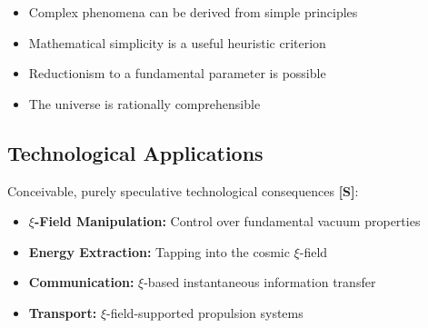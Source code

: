 	\begin{itemize}
		\item Complex phenomena can be derived from simple principles
		\item Mathematical simplicity is a useful heuristic criterion
		\item Reductionism to a fundamental parameter is possible
		\item The universe is rationally comprehensible
	\end{itemize}

	\subsection{Technological Applications}
	
	Conceivable, purely speculative technological consequences \textbf{[S]}:
	
	\begin{itemize}
		\item \textbf{$\xi$-Field Manipulation:} Control over fundamental vacuum properties
		\item \textbf{Energy Extraction:} Tapping into the cosmic $\xi$-field
		\item \textbf{Communication:} $\xi$-based instantaneous information transfer
		\item \textbf{Transport:} $\xi$-field-supported propulsion systems
	\end{itemize}

